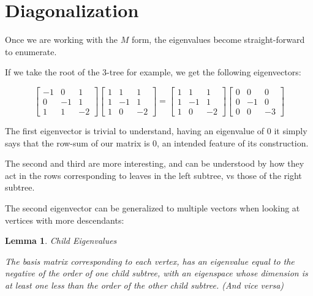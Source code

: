 \documentclass[10pt,a4paper]{report}
\newtheorem{lemma}{Lemma}
\begin{document}
\section{Diagonalization}

Once we are working with the $M$ form, the eigenvalues become straight-forward
to enumerate.

If we take the root of the 3-tree for example, we get the following
eigenvectors:

\begin{equation*}
\left[\begin{matrix}
	-1 & 0 & 1\\
	0 & -1 & 1\\
	1 & 1 & -2
\end{matrix}\right]
\left[\begin{matrix}
	1 & 1 & 1\\
	1 & -1 & 1\\
	1 & 0 & -2
\end{matrix}\right]
=
\left[\begin{matrix}
	1 & 1 & 1\\
	1 & -1 & 1\\
	1 & 0 & -2
\end{matrix}\right]
\left[\begin{matrix}
	0 & 0 & 0\\
	0 & -1 & 0\\
	0 & 0 & -3
\end{matrix}\right]
\end{equation*}

The first eigenvector is trivial to understand, having an eigenvalue of 0 it
simply says that the row-sum of our matrix is 0, an intended feature of its
construction.

The second and third are more interesting, and can be understood by how they
act in the rows corresponding to leaves in the left subtree, vs those of the
right subtree.

The second eigenvector can be generalized to multiple vectors when looking at
vertices with more descendants:

\begin{lemma} Child Eigenvalues

	The basis matrix corresponding to each vertex, has an eigenvalue equal to
	the negative of the order of one child subtree, with an eigenspace whose
	dimension is at least one less than the order of the other child subtree.
	(And vice versa)
\end{lemma}
\end{document}
